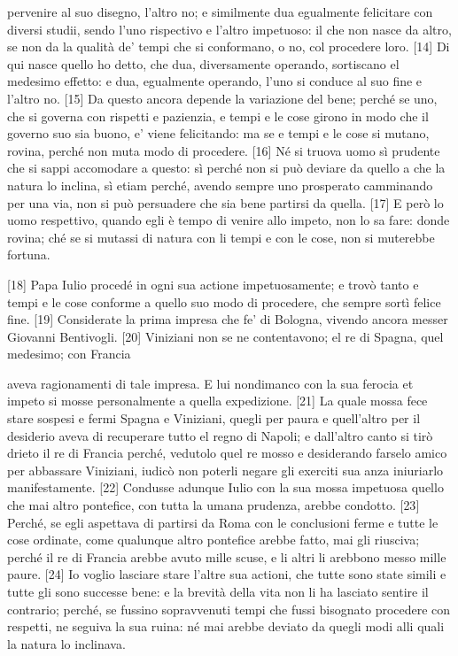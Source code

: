\quebra

\noindent{}pervenire al suo disegno, l'altro no; e similmente dua egualmente felicitare con diversi studii, sendo l'uno rispectivo e l'altro impetuoso: il che non nasce da altro, se non da la qualità de' tempi che si conformano, o no, col procedere loro. {[}14{]} Di qui nasce quello ho detto, che dua, diversamente operando, sortiscano el medesimo effetto: e dua, egualmente operando, l'uno si conduce al suo fine e l'altro no. {[}15{]} Da questo ancora depende la variazione del bene; perché se uno, che si governa con rispetti e pazienzia, e tempi e le cose girono in modo che il governo suo sia buono, e' viene felicitando: ma se e tempi e le cose si mutano, rovina, perché non muta modo di procedere. {[}16{]} Né si truova uomo sì prudente che si sappi accomodare a questo: sì perché non si può deviare da quello a che la natura lo inclina, sì etiam perché, avendo sempre uno prosperato camminando per una via, non si può persuadere che sia bene partirsi da quella. {[}17{]} E però lo uomo respettivo, quando egli è tempo di venire allo impeto, non lo sa fare: donde rovina; ché se si mutassi di natura con li tempi e con le cose, non si muterebbe fortuna.

{[}18{]} Papa Iulio  procedé in ogni sua actione impetuosamente; e trovò tanto e tempi e le cose conforme a quello suo modo di procedere, che sempre sortì felice fine. {[}19{]} Considerate la prima impresa che fe' di Bologna, vivendo ancora messer Giovanni Bentivogli. {[}20{]} Viniziani non se ne contentavono; el re di Spagna, quel medesimo; con Francia

\quebra

\noindent{}aveva ragionamenti di tale impresa. E lui nondimanco con la sua ferocia et impeto si mosse personalmente a quella expedizione. {[}21{]} La quale mossa fece stare sospesi e fermi Spagna e Viniziani, quegli per paura e quell'altro per il desiderio aveva di recuperare tutto el regno di Napoli; e dall'altro canto si tirò drieto il re di Francia perché, vedutolo quel re mosso e  desiderando farselo amico per abbassare Viniziani, iudicò non poterli negare gli exerciti sua anza iniuriarlo manifestamente. {[}22{]} Condusse adunque Iulio con la sua mossa impetuosa quello che mai altro pontefice, con tutta la umana prudenza, arebbe condotto. {[}23{]} Perché, se egli aspettava di partirsi da Roma con le conclusioni ferme e tutte le cose ordinate, come qualunque altro pontefice arebbe fatto, mai gli riusciva; perché il re di Francia arebbe avuto mille scuse, e li altri li arebbono messo mille paure. {[}24{]} Io voglio lasciare stare l'altre sua actioni, che tutte sono state simili e tutte gli sono successe bene: e la brevità della vita non li ha lasciato sentire il contrario; perché, se fussino sopravvenuti tempi che fussi bisognato procedere con respetti, ne seguiva la sua ruina: né mai arebbe deviato da quegli modi alli quali la natura lo inclinava.

